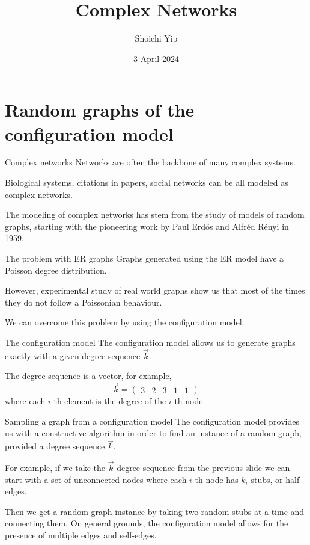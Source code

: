 \documentclass[handout]{beamer}
\title{Complex Networks}
\author{Shoichi Yip}
\institute{M2 PCS}
\date{3 April 2024}
\newcommand{\myvec}[1]{\ensuremath{\begin{pmatrix}#1\end{pmatrix}}}
\begin{document}
\frame{\titlepage}

\section{Random graphs of the configuration model}

\begin{frame}{Complex networks}
    \alert{Networks} are often the backbone of many complex systems.

    Biological systems, citations in papers, social networks can be all modeled
    as complex networks.

    The modeling of complex networks has stem from the study of
    \alert{models of random graphs}, starting with the pioneering work by Paul
    Erd\H{o}s and Alfr\'{e}d R\'{e}nyi in 1959.
\end{frame}

\begin{frame}{The problem with ER graphs}
    Graphs generated using the ER model have a Poisson degree distribution.

    However, experimental study of real world graphs show us that most of the
    times they do not follow a Poissonian behaviour.

    We can overcome this problem by using the \alert{configuration model}.
\end{frame}

\begin{frame}{The configuration model}
    The \alert{configuration model} allows us to generate graphs exactly with a
    given \alert{degree sequence} $\vec k$.

    The degree sequence is a vector, for example,
    $$
    \vec k = \myvec{3 & 2 & 3 & 1 & 1}
    $$
    where each $i$-th element is the degree of the $i$-th node.
\end{frame}

\begin{frame}{Sampling a graph from a configuration model}
    The configuration model provides us with a constructive algorithm in order
    to find an instance of a random graph, provided a degree sequence $\vec k$.

    For example, if we take the $\vec k$ degree sequence from the previous slide
    we can start with a set of unconnected nodes where each $i$-th node has
    $k_i$ \alert{stubs}, or half-edges.

    Then we get a random graph instance by taking two random stubs at a time and
    connecting them. On general grounds, the configuration model allows for the
    presence of multiple edges and self-edges.
\end{frame}
\end{document}
